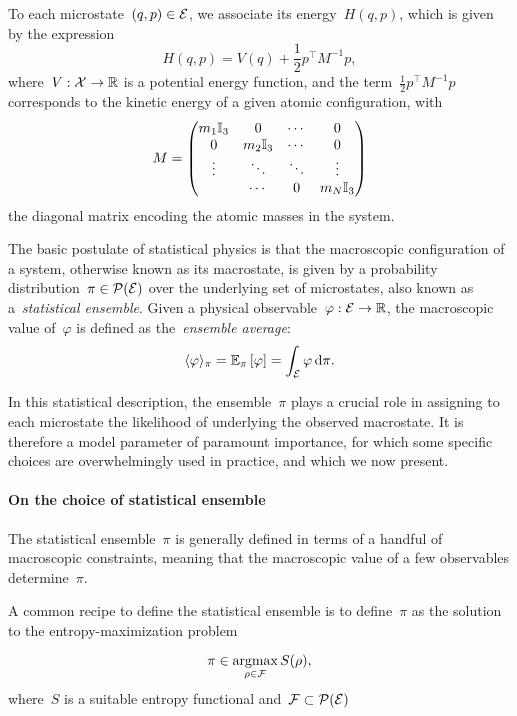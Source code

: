 To each microstate~$(q,p)\in\mathcal{E}$, we associate its energy~$H(q,p)$, which is given by the expression
\begin{equation}
    \label{eq:01:hamiltonian}
    H(q,p) = V(q) + \frac12p^\top M^{-1}p,
\end{equation}
where~$V:\mathcal{X}\to\mathbb{R}$ is a potential energy function, and the term~$\frac12p^\top M^{-1}p$ corresponds to the kinetic energy of a given atomic configuration, with
\[
M = \begin{pmatrix}
    m_1 \mathbb{I}_3 & 0 & \dotsm & 0 \\
    0 & m_2 \mathbb{I}_3 & \dotsm & 0 \\
    \vdots & \ddots & \ddots & \vdots\\
    & \dotsm & 0 & m_N \mathbb{I}_3 
\end{pmatrix}
\]
the diagonal matrix encoding the atomic masses in the system.

The basic postulate of statistical physics is that the macroscopic configuration of a system, otherwise known as its macrostate, is given by a probability distribution~$\pi\in\mathcal{P}(\mathcal{E})$ over the underlying set of microstates, also known as a~\textit{statistical ensemble}.
Given a physical observable~$\varphi:\mathcal{E}\to\mathbb{R}$, the macroscopic value of~$\varphi$ is defined as the~\textit{ensemble average}:
\begin{equation}
    \label{eq:01:ensemble_average}
    \langle \varphi\rangle_{\pi} = \mathbb{E}_\pi\left[\varphi\right]= \int_{\mathcal{E}}\varphi\,\mathrm{d} \pi.
\end{equation}

In this statistical description, the ensemble~$\pi$ plays a crucial role in assigning to each microstate the likelihood of underlying the observed macrostate.
It is therefore a model parameter of paramount importance, for which some specific choices are overwhelmingly used in practice, and which we now present.

\paragraph{On the choice of statistical ensemble}
The statistical ensemble~$\pi$ is generally defined in terms of a handful of macroscopic constraints, meaning that the macroscopic value of a few observables determine~$\pi$.

A common recipe to define the statistical ensemble is to define~$\pi$ as the solution to the entropy-maximization problem

\begin{equation}
    \pi\in\underset{\rho\in\mathcal{F}}{\operatorname*{argmax}}\,S(\rho),
\end{equation}
where~$S$ is a suitable entropy functional and~$\mathcal{F}\subset\mathcal{P}(\mathcal{E})$

